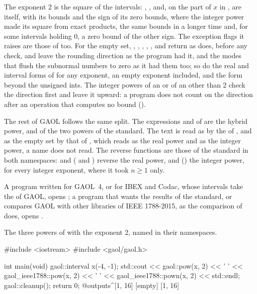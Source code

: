 \documentclass[12pt,a4paper,twoside,openright]{book}
\begin{document}
\medskip
The exponent 2 is the square of the intervals: ,
,  and, on the part of $x$
in ,  are 
itself, with its bounds and the sign of its zero bounds, where the integer
power made its square from exact products, the same bounds in a longer time
and, for some intervals holding 0, a zero bound of the other
sign.\newinvfive{} The exception flags it raises are those of 
too. For the empty set, , ,
, , ,
 and 
return as  does, before any check, and leave the rounding direction
as the program had it, and the modes that flush the subnormal numbers to zero
as it had them too; so do the real and interval forms of  for any
exponent, an empty exponent included, and the  form beyond
the unsigned ints.\newinvfive{} The integer powers of an  or of an
 other than 2 check the direction first and leave it
upward: a program does not count on the direction after an operation that
computes no bound ().

\medskip
The rest of GAOL follows the same split. The expressions 
and  of  are the hybrid power, 
and  of  the two powers of the
standard. The text  is read as  by the
 of , and as the empty set by that of
, which reads  as the real power and
 as the integer power, a name  does not
read. The reverse functions are those of the standard in both namespaces:
 and  ( and
) reverse the real power, and 
() the integer power, for every integer exponent, where it took
$n\geq 1$ only.\newinvfive

A program written for GAOL~4, or for IBEX and Codac, whose intervals take the
 of GAOL, opens ; a program that wants the results of the
standard, or compares GAOL with other libraries of IEEE 1788-2015, as the
comparison of  does, opens .

\begin{Ex}\label{ex:pow-namespaces}
The three powers of  with the exponent 2, named in their
namespaces.
\begin{example}
#include <iostream>
#include <gaol/gaol.h>

int main(void)
{
  gaol::interval x(-4, -1);
  std::cout << gaol::pow(x, 2) << ' '
            << gaol_ieee1788::pow(x, 2) << ' '
            << gaol_ieee1788::pown(x, 2) << std::endl;
  gaol::cleanup();
  return 0;
}
@outputs^[1, 16] [empty] [1, 16]~
\end{example}
\end{Ex}
\end{document}
